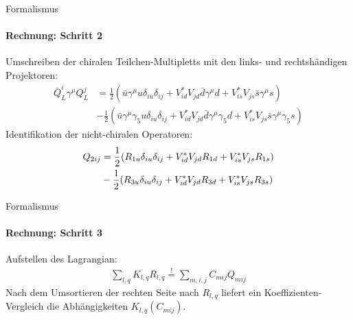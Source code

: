 \begin{frame}{Formalismus}
\framesubtitle{Rechnung: Schritt 2}
Umschreiben der chiralen Teilchen-Multipletts mit den links- und rechtshändigen Projektoren:
\begin{align*}
	\bar{Q}_L^i\gamma^\mu Q_L^j &=\frac{1}{2}(
	\bar{u}\gamma^\mu u\delta_{iu}\delta_{ij} + V_{id}^*V_{jd}\bar{d}\gamma^\mu d
	+ V_{is}^*V_{js}\bar{s}\gamma^\mu s) \\
	&- \frac{1}{2}(\bar{u}\gamma^\mu\gamma_5u\delta_{iu}\delta_{ij} + V_{id}^*V_{jd}\bar{d}\gamma^\mu\gamma_5d + V_{is}^*V_{js}\bar{s}\gamma^\mu\gamma_5s)
\end{align*}
Identifikation der nicht-chiralen Operatoren:
\begin{align*}
	Q_{2ij} &= \frac{1}{2}(R_{1u}\delta_{iu}\delta_{ij}+ V_{id}^*V_{jd}R_{1d}+ V_{is}^*V_{js}R_{1s}) \notag \\
	&- \frac{1}{2}(R_{3u}\delta_{iu}\delta_{ij} + V_{id}^*V_{jd}R_{3d} + V_{is}^*V_{js}R_{3s})
\end{align*}
\end{frame}


\begin{frame}{Formalismus}
\framesubtitle{Rechnung: Schritt 3}
Aufstellen des Lagrangian:
\begin{align*}
	\sum_{l,q} K_{l,q}R_{l,q} \overset{!}{=} \sum_{m,i,j}C_{mij}Q_{mij}
\end{align*}
Nach dem Umsortieren der rechten Seite nach $R_{l,q}$ liefert ein Koeffizienten-Vergleich die Abhängigkeiten $K_{l,q}(C_{mij})$.
\end{frame}
